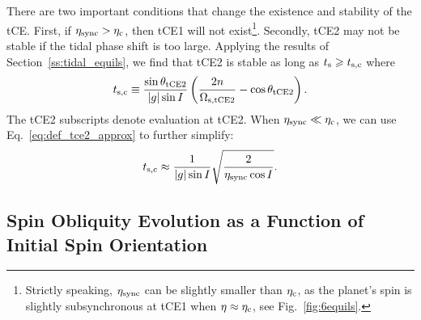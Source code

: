 \documentclass[
        fleqn,
        usenatbib,
    ]{mnras}
\newcommand*{\abs}[1]{\left|#1\right|}
\newcommand*{\p}[1]{\left(#1\right)}
\begin{document}
There are two important conditions that change the existence and stability of
the tCE\@. First, if $\eta_{\rm sync} > \eta_{\rm c}$, then tCE1 will not
exist\footnote{Strictly speaking, $\eta_{\rm sync}$ can be slightly smaller than
$\eta_{\rm c}$, as the planet's spin is slightly subsynchronous at tCE1 when
$\eta \approx \eta_{\rm c}$, see Fig.~\ref{fig:6equils}.}. Secondly, tCE2 may
not be stable if the tidal phase shift is too large. Applying the results of
Section~\ref{ss:tidal_equils}, we find that tCE2 is stable as long as $t_{\rm s}
\geq t_{\rm s, c}$ where
\begin{equation}
    t_{\rm s, c} \equiv \frac{\sin \theta_{\rm tCE2}}{\abs{g} \sin
            I}\p{\frac{2n}{\Omega_{\rm s, tCE2}} - \cos \theta_{\rm tCE2}}.
\end{equation}
The tCE2 subscripts denote evaluation at tCE2. When $\eta_{\rm sync} \ll
\eta_{\rm c}$, we can use Eq.~\eqref{eq:def_tce2_approx} to further simplify:
\begin{equation}
    t_{\rm s, c}\approx \frac{1}{\abs{g}\sin I}\sqrt{\frac{2}{\eta_{\rm sync}
        \cos I}}. \label{eq:def_ta_crit}
\end{equation}

\subsection{Spin Obliquity Evolution as a Function of Initial Spin Orientation}
\end{document}
